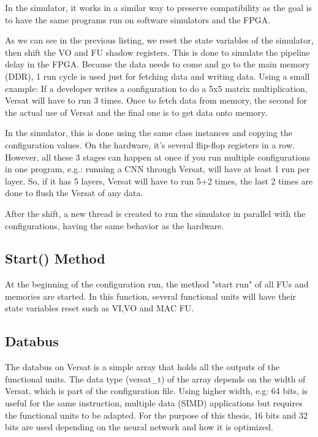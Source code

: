 In the simulator, it works in a similar way to preserve compatibility 
as the goal is to have the same
programs run on software simulators and the FPGA.



As we can see in the previous listing, we reset the state variables of the simulator, then shift the 
VO and FU shadow registers.
This is done to simulate the pipeline delay in the FPGA. 
Because the data needs to come and go to the main memory (DDR),
1 run cycle is used just for fetching data and writing data. 
Using a small example:
If a developer writes a configuration to do a 5x5 matrix multiplication, 
Versat will have to run 3 times.
Once to fetch data from memory, the second for the actual use of Versat 
and the final one is to get data onto memory.

In the simulator, this is done using the same class instances and 
copying the configuration values. On the hardware, it's several flip-flop registers in a row.
However, all these 3 stages can happen at once if you run multiple configurations in one program, 
e.g.: running a CNN
through Versat, will have at least 1 run per layer. 
So, if it has 5 layers, Versat will have to run 5+2 times, the last 2 times are done to
flush the Versat of any data.

After the shift, a new thread is created to run the simulator in parallel 
with the configurations,
having the same behavior as the hardware.

\subsection{Start() Method}

At the beginning of the configuration run, the method "start run" of 
all FUs and memories are started.
In this function, several functional units will have their state variables 
reset such as VI,VO and MAC FU.

\subsection{Databus}

The databus on Versat is a simple array that holds all the outputs of the functional units.
The data type (versat\_t) of the array depends on the width of Versat, which is part of the configuration file.
Using higher width, e.g: 64 bits, is useful for the same instruction, multiple data (SIMD) 
applications but requires the functional units to be adapted.
For the purpose of this thesis, 16 bits and 32 bits are used depending 
on the neural network and how it is optimized.


